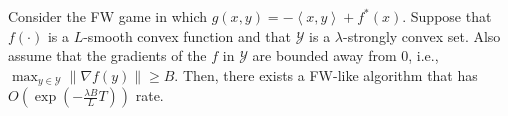 \documentclass[final,12pt]{colt2018} %
\def\reals{\mathbb{R}}
\def\reals{\mathbb{R}}
\newcommand{\norm}[1]{\left\lVert#1\right\rVert}
\newcommand{\norme}[1]{\norm{#1}}
\newcommand{\lr}[2]{\left\langle#1,#2\right\rangle}
\newcommand{\YY}{\mathcal{Y}}
\newcommand{\pr}[1]{\left(#1\right)}
\begin{document}
\begin{theorem}\label{thm:linearFW} 
Consider the FW game in which $g(x,y)= -\lr{x}{y} + f^{*}(x)$.
Suppose that $f(\cdot)$ is a $L$-smooth convex function
and that $\YY$ is a $\lambda$-strongly convex set. Also assume that the gradients of the $f$ in $\YY$ are bounded away from $0$, i.e., $\max_{y\in\YY}\|\nabla f(y)\|\geq B$.
Then, there exists a FW-like algorithm that has $O(\exp(-\frac{\lambda B }{L} T))$ rate.
\end{theorem}







\end{document}
